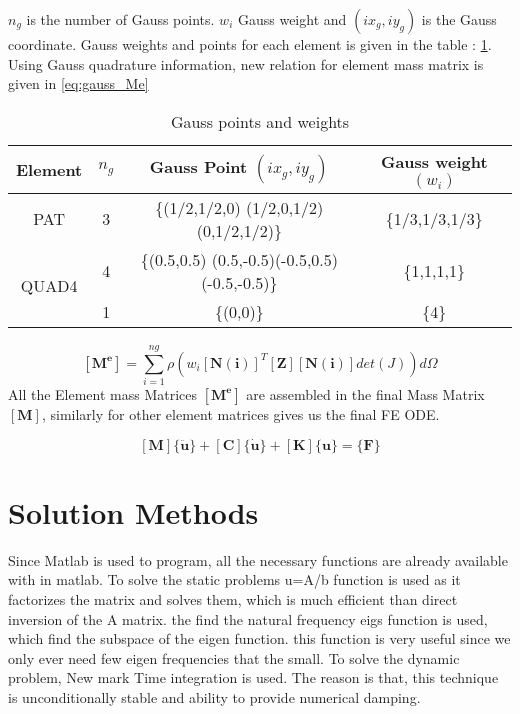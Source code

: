 \documentclass[main.tex]{subfiles}
\begin{document}
$n_g$ is the number of Gauss points. $w_i$ Gauss weight and $(ix_g,iy_g)$ is the Gauss coordinate. Gauss weights and points for each element is given in the table : \ref{tb:gauss}. Using Gauss quadrature information, new relation for element mass matrix is given in \ref{eq:gauss_Me}

\begin{table}[h]
\centering
\begin{tabular}{|c|c|c|c|}
\hline
Element                & $n_g$ & Gauss Point $(ix_g,iy_g)$                                   & Gauss weight $(w_i)$   \\ \hline
PAT                    & 3     & \{(1/2,1/2,0) (1/2,0,1/2) (0,1/2,1/2)\}       & \{1/3,1/3,1/3\} \\ \hline
\multirow{2}{*}{QUAD4} & 4     & \{(0.5,0.5) (0.5,-0.5)(-0.5,0.5)(-0.5,-0.5)\} & \{1,1,1,1\}     \\ \cline{2-4} 
                       & 1     & \{(0,0)\}                                     & \{4\}           \\ \hline
\end{tabular}
\caption{Gauss points and weights}
\label{tb:gauss}
\end{table}

\begin{equation}\label{eq:gauss_Me}
\left[ \mathbf{M^e}  \right] 
=
\sum_{i = 1}^{ng}
\rho\left(w_i
\left[ \mathbf{N(i)}  \right]^T
\left[ \mathbf{Z}  \right]
\left[ \mathbf{N(i)}  \right] 
det(J)\right)  d \Omega
\end{equation}
All the Element mass Matrices $\left[ \mathbf{M^e}  \right]$ are assembled in the final Mass Matrix $\left[ \mathbf{M} \right]$, similarly for other element matrices gives us the final FE ODE.



\begin{equation}
\left[ \mathbf{M}  \right] 
\{ \ddot{\mathbf{u}} \}
+
\left[ \mathbf{C}  \right] 
\{ \dot{\mathbf{u}} \}
+
\left[ \mathbf{K}  \right] 
\{\mathbf{u} \}
=
\{ \mathbf{F} \}
\end{equation}



\section{Solution Methods}
Since Matlab is used to program, all the necessary functions are already available with in matlab. To solve the static problems u=A/b function is used as it factorizes the matrix and solves them, which is much efficient than direct inversion of the A matrix. the find the natural frequency eigs function is used, which find the subspace of the eigen function. this function is very useful since we only ever need few eigen frequencies that the small. To solve the dynamic problem, New mark Time integration is used. The reason is that, this technique is unconditionally  stable and ability to provide numerical damping.
\end{document}
